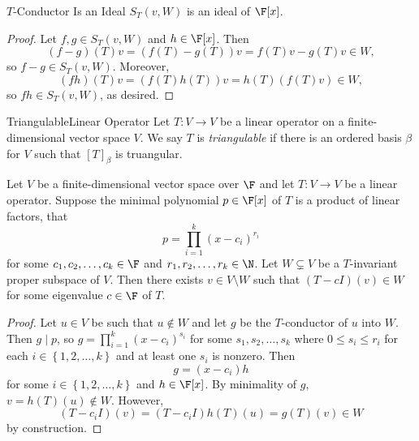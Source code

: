 \documentclass[math_245.tex]{subfiles}
\begin{document}
    \begin{prop}{$T$-Conductor Is an Ideal}
        $S_T(v, W)$ is an ideal of $\F[x]$.
    \end{prop}

    \begin{proof}
        Let $f,g\in S_T(v, W)$ and $h\in \F[x]$. Then
        \begin{equation*}
            (f-g)(T)v = \left( f(T)-g(T) \right) v = f(T)v - g(T)v\in W,
        \end{equation*}
        so $f-g\in S_T(v, W)$. Moreover,
        \begin{equation*}
            (fh)(T)v = (f(T)h(T))v = h(T) \left( f(T)v \right) \in W,
        \end{equation*}
        so $fh\in S_T(v, W)$, as desired.
    \end{proof}

    \begin{definition}{Triangulable}{Linear Operator}
        Let $T:V\to V$ be a linear operator on a finite-dimensional vector space $V$. We say $T$ is \emph{triangulable} if there is an ordered basis $\beta$ for $V$ such that $[T]_\beta$ is truangular.
    \end{definition}
    
    \begin{lemma}{}
        Let $V$ be a finite-dimensional vector space over $\F$ and let $T:V\to V$ be a linear operator. Suppose the minimal polynomial $p\in\F[x]$ of $T$ is a product of linear factors, that
        \begin{equation*}
            p = \prod^{k}_{i=1} (x-c_i)^{r_i}
        \end{equation*}
        for some $c_1, c_2, \ldots, c_k\in \F$ and $r_1, r_2, \ldots, r_k\in \N$. Let $W\subsetneq V$ be a $T$-invariant proper subspace of $V$. Then there exists $v\in V\setminus W$ such that $(T-cI)(v)\in W$ for some eigenvalue $c\in \F$ of $T$.
    \end{lemma}

    \begin{proof}
        Let $u\in V$ be such that $u\notin W$ and let $g$ be the $T$-conductor of $u$ into $W$. Then $g\mid p$, so $g = \prod^{k}_{i=1} (x-c_i)^{s_i}$ for some $s_1, s_2, \ldots, s_k$ where $0\leq s_i\leq r_i$ for each $i\in \left\lbrace 1, 2, \ldots, k \right\rbrace$ and at least one $s_i$ is nonzero. Then
        \begin{equation*}
            g = (x-c_i)h
        \end{equation*}
        for some $i\in \left\lbrace 1, 2, \ldots, k \right\rbrace$ and $h\in \F[x]$. By minimality of $g$, $v = h(T)(u)\notin W$. However,
        \begin{equation*}
            (T-c_iI)(v) = \left( T-c_iI \right)h(T)(u) = g(T)(v) \in W 
        \end{equation*}
        by construction.
    \end{proof}
\end{document}
